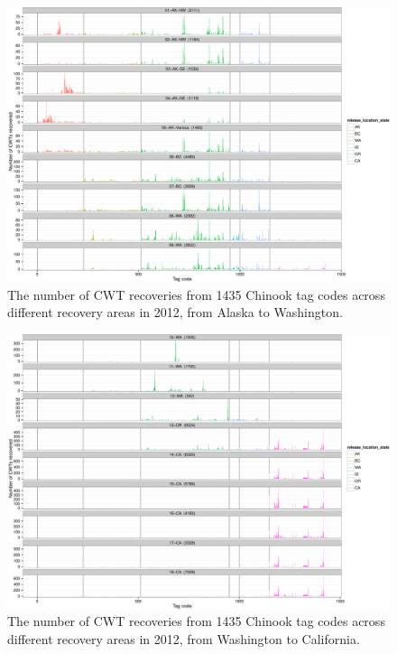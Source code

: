 \documentclass[11pt]{article}
\begin{document}
\begin{figure}
\begin{center}
\includegraphics[width=\textwidth]{images/recovery_histo_panel_1.pdf}
\end{center}
\caption{The number of CWT recoveries from 1435 Chinook tag codes across different recovery areas in 2012, from Alaska to Washington.}
\end{figure}


\begin{figure}
\begin{center}
\includegraphics[width=\textwidth]{images/recovery_histo_panel_2.pdf}
\end{center}
\caption{The number of CWT recoveries from 1435 Chinook tag codes across different recovery areas in 2012, from Washington to California.}
\end{figure}
\end{document}
